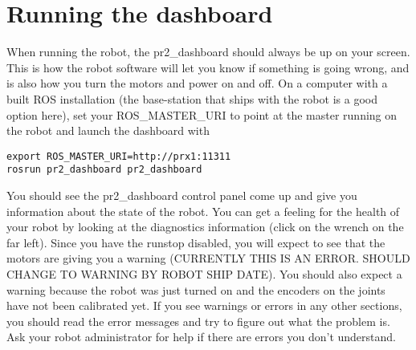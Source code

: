 \section{Running the dashboard}
When running the robot, the pr2\_dashboard should always be up on your screen.  This is how the robot software will let you know if something is going wrong, and is also how you turn the motors and power on and off.  On a computer with a built ROS installation (the base-station that ships with the robot is a good option here), set your ROS\_MASTER\_URI to point at the master running on the robot and launch the dashboard with
\begin{verbatim}
export ROS_MASTER_URI=http://prx1:11311
rosrun pr2_dashboard pr2_dashboard
\end{verbatim}
You should see the pr2\_dashboard control panel come up and give you information about the state of the robot.  You can get a feeling for the health of your robot by looking at the diagnostics information (click on the wrench on the far left).  Since you have the runstop disabled, you will expect to see that the motors are giving you a warning (CURRENTLY THIS IS AN ERROR.  SHOULD CHANGE TO WARNING BY ROBOT SHIP DATE).  You should also expect a warning because the robot was just turned on and the encoders on the joints have not been calibrated yet.
If you see warnings or errors in any other sections, you should read the error messages and try to figure out what the problem is.  Ask your robot administrator for help if there are errors you don't understand.
